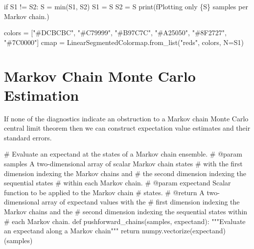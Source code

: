 \documentclass[
  letterpaper,
  DIV=11,
  numbers=noendperiod]{scrartcl}
\newenvironment{Shaded}{\begin{snugshade}}{\end{snugshade}}
\newcommand{\BuiltInTok}[1]{\textcolor[rgb]{0.00,0.23,0.31}{#1}}
\newcommand{\CommentTok}[1]{\textcolor[rgb]{0.37,0.37,0.37}{#1}}
\newcommand{\ControlFlowTok}[1]{\textcolor[rgb]{0.00,0.23,0.31}{#1}}
\newcommand{\KeywordTok}[1]{\textcolor[rgb]{0.00,0.23,0.31}{#1}}
\newcommand{\NormalTok}[1]{\textcolor[rgb]{0.00,0.23,0.31}{#1}}
\newcommand{\OperatorTok}[1]{\textcolor[rgb]{0.37,0.37,0.37}{#1}}
\newcommand{\SpecialCharTok}[1]{\textcolor[rgb]{0.37,0.37,0.37}{#1}}
\newcommand{\SpecialStringTok}[1]{\textcolor[rgb]{0.13,0.47,0.30}{#1}}
\newcommand{\StringTok}[1]{\textcolor[rgb]{0.13,0.47,0.30}{#1}}
\begin{document}
\begin{Shaded}
\begin{Highlighting}[]
  \ControlFlowTok{if}\NormalTok{ S1 }\OperatorTok{!=}\NormalTok{ S2:}
\NormalTok{    S }\OperatorTok{=} \BuiltInTok{min}\NormalTok{(S1, S2)}
\NormalTok{    S1 }\OperatorTok{=}\NormalTok{ S}
\NormalTok{    S2 }\OperatorTok{=}\NormalTok{ S}
    \BuiltInTok{print}\NormalTok{(}\SpecialStringTok{f\textquotesingle{}Plotting only }\SpecialCharTok{\{}\NormalTok{S}\SpecialCharTok{\}}\SpecialStringTok{ samples per Markov chain.\textquotesingle{}}\NormalTok{)}
  
\NormalTok{  colors }\OperatorTok{=}\NormalTok{ [}\StringTok{"\#DCBCBC"}\NormalTok{, }\StringTok{"\#C79999"}\NormalTok{, }\StringTok{"\#B97C7C"}\NormalTok{,}
            \StringTok{"\#A25050"}\NormalTok{, }\StringTok{"\#8F2727"}\NormalTok{, }\StringTok{"\#7C0000"}\NormalTok{]}
\NormalTok{  cmap }\OperatorTok{=}\NormalTok{ LinearSegmentedColormap.from\_list(}\StringTok{"reds"}\NormalTok{, colors, N}\OperatorTok{=}\NormalTok{S1)}
\end{Highlighting}
\end{Shaded}

\hypertarget{markov-chain-monte-carlo-estimation}{%
\section{Markov Chain Monte Carlo
Estimation}\label{markov-chain-monte-carlo-estimation}}

If none of the diagnostics indicate an obstruction to a Markov chain
Monte Carlo central limit theorem then we can construct expectation
value estimates and their standard errors.

\begin{Shaded}
\begin{Highlighting}[]
\CommentTok{\# Evaluate an expectand at the states of a Markov chain ensemble.}
\CommentTok{\# @param samples A two{-}dimensional array of scalar Markov chain states }
\CommentTok{\#                with the first dimension indexing the Markov chains and }
\CommentTok{\#                the second dimension indexing the sequential states }
\CommentTok{\#                within each Markov chain.}
\CommentTok{\# @param expectand Scalar function to be applied to the Markov chain }
\CommentTok{\#                  states.}
\CommentTok{\# @return A two{-}dimensional array of expectand values with the }
\CommentTok{\#         first dimension indexing the Markov chains and the }
\CommentTok{\#         second dimension indexing the sequential states within }
\CommentTok{\#         each Markov chain.}
\KeywordTok{def}\NormalTok{ pushforward\_chains(samples, expectand):}
  \CommentTok{"""Evaluate an expectand along a Markov chain"""}
  \ControlFlowTok{return}\NormalTok{ numpy.vectorize(expectand)(samples)}
\end{Highlighting}
\end{Shaded}
\end{document}
